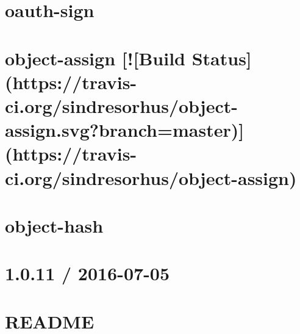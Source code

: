 \documentclass[twoside]{book}
\newcommand{\+}{\discretionary{\mbox{\scriptsize$\hookleftarrow$}}{}{}}
\begin{document}
\chapter{oauth-\/sign}
\label{md__c_1_workspace_demo_src_main_script_node_modules_oauth-sign__r_e_a_d_m_e}

\chapter{object-\/assign \mbox{[}!\mbox{[}Build Status\mbox{]}(https\+://travis-\/ci.org/sindresorhus/object-\/assign.svg?branch=master)\mbox{]}(https\+://travis-\/ci.org/sindresorhus/object-\/assign)}
\label{md__c_1_workspace_demo_src_main_script_node_modules_object-assign_readme}

\chapter{object-\/hash}
\label{md__c_1_workspace_demo_src_main_script_node_modules_object-hash_readme}

\chapter{1.0.11 / 2016-\/07-\/05}
\label{md__c_1_workspace_demo_src_main_script_node_modules_object-keys__c_h_a_n_g_e_l_o_g}

\chapter{R\+E\+A\+D\+ME}
\label{md__c_1_workspace_demo_src_main_script_node_modules_object-keys__r_e_a_d_m_e}

\end{document}
